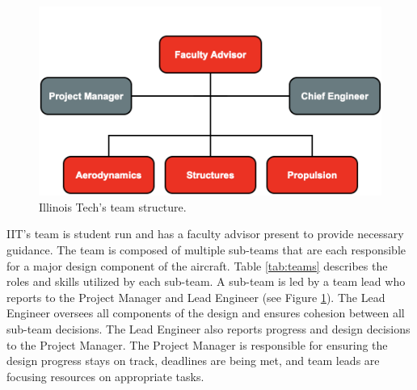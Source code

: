 %
\begin{figure}
    \vspace{-2em}
    \centering
    \includegraphics[width=\linewidth]{Images/ts.png}
    \caption{Illinois Tech's team structure.}
    \label{fig:teamstruc}
    \vspace{0.3em}
\end{figure}
%
IIT's team is student run and has a faculty advisor present to provide necessary guidance. The team is composed of multiple sub-teams that are each responsible for a major design component of the aircraft. Table \ref{tab:teams} describes the roles and skills utilized by each sub-team. A sub-team is led by a team lead who reports to the Project Manager and Lead Engineer (see Figure \ref{fig:teamstruc}). The Lead Engineer oversees all components of the design and ensures cohesion between all sub-team decisions. The Lead Engineer also reports progress and design decisions to the Project Manager. The Project Manager is responsible for ensuring the design progress stays on track, deadlines are being met, and team leads are focusing resources on appropriate tasks.
%
\vfill
